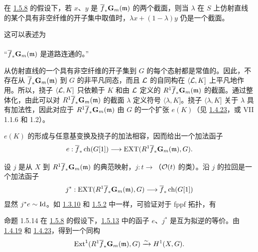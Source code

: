 \subsubsection{}
在 \hyperref[XVIII.subsubsec1.5.8]{1.5.8} 的假设下，若 $x$、$y$ 是 $\overline{f}_{\ast}\mathbf{G}_{m}(\mathfrak{m})$ 的两个截面，则当 $\lambda$ 在 $S$ 上仿射直线的某个具有非空纤维的开子集中取值时，$\lambda x+(1-\lambda)y$ 仍是一个截面。

这可以表述为

\paragraph{}
“$\overline{f}_{\ast}\mathbf{G}_{m}(\mathfrak{m})$ 是道路连通的。”

从仿射直线的一个具有非空纤维的开子集到 $G$ 的每个\pageoriginale{}态射都是常值的。因此，不存在从 $\overline{f}_{\ast}\mathbf{G}_{m}(\mathfrak{m})$ 到 $G$ 的非平凡同态，而且 ${\mathcal L}$ 的自同构在 $\langle {\mathcal L},K]$ 上平凡地作用。所以，挠子 $\langle {\mathcal L},K]$ 只依赖于 $K$ 和由 ${\mathcal L}$ 定义的 $R^{1}\overline{f}_{\ast}\mathbf{G}_{m}(\mathfrak{m})$ 的截面。通过整体化，由此可以对 $R^{1}\overline{f}_{\ast}\mathbf{G}_{m}(\mathfrak{m})$ 的截面 $\lambda$ 定义符号 $\langle \lambda,K]$。挠子 $\langle \lambda,K]$ 关于 $\lambda$ 具有加法性，因此对应于 $R^{1}\overline{f}_{\ast}\mathbf{G}_{m}(\mathfrak{m})$ 由 $G$ 的一个扩张 $e(K)$（见 \hyperref[XVIII.prop1.4.23]{1.4.23}，或  VII 1.1.6 和 1.2）。

$e(K)$ 的形成与任意基变换及挠子的加法相容，因而给出一个加法函子
$$
e:\overline{f}_{\ast}\operatorname{ch}(G[1])\longrightarrow
\operatorname{EXT}(R^{1}\overline{f}_{\ast}\mathbf{G}_{m}(\mathfrak{m}),G){}.
$$

设 $j$ 是从 $X$ 到 $R^{1}\overline{f}_{\ast}\mathbf{G}_{m}(\mathfrak{m})$ 的典范映射，$j:t\rightarrow$（${\mathcal O}(t)$ 的类）。沿 $j$ 的拉回是一个加法函子
$$
j^{\ast}:\operatorname{EXT}(R^{1}\overline{f}_{\ast}\mathbf{G}_{m}(\mathfrak{m}),G)\longrightarrow
\overline{f}_{\ast}\operatorname{ch}(G[1])
$$
显然 $j^{\ast}e\sim \operatorname{Id}$。如 \hyperref[XVIII.thm1.3.10]{1.3.10} 和 \hyperref[XVIII.thm1.5.2]{1.5.2} 中一样，可验证对于 fppf 拓扑，有

\begin{enonce*}{命题 1.5.14}
在 \hyperref[XVIII.subsubsec1.5.8]{1.5.8} 的假设下，\hyperref[XVIII.subsubsec1.5.13]{1.5.13} 中的函子 $e$、$j^{\ast}$ 是互为拟逆的等价。由 \hyperref[XVIII.const1.4.19]{1.4.19} 和 \hyperref[XVIII.prop1.4.23]{1.4.23}，得到一个同构
$$
\operatorname{Ext}^{1}(R^{1}\overline{f}_{\ast}\mathbf{G}_{m}(\mathfrak{m}),G)\xrightarrow{\sim}
H^{1}(X,G){}.
$$
\end{enonce*}

